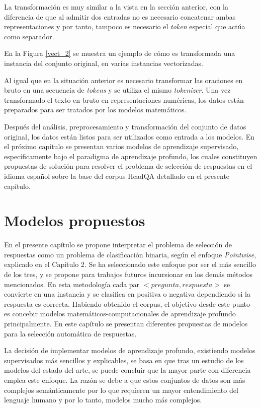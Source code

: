 La transformación es muy similar a la vista en la sección anterior, con la diferencia de que al admitir dos entradas no es necesario concatenar ambas representaciones y por tanto, tampoco es necesario el \textit{token} especial que actúa como separador.

En la Figura \ref{vect_2} se muestra un ejemplo de cómo es transformada una instancia del conjunto original, en varias instancias vectorizadas. 

Al igual que en la situación anterior es necesario transformar las oraciones en bruto en una secuencia de \textit{tokens} y se utiliza el mismo \textit{tokenizer}.
Una vez transformado el texto en bruto en representaciones numéricas, los datos están preparados para ser tratados por los modelos matemáticos.   


Después del análisis, preprocesamiento y transformación del conjunto de datos original, los datos están listos para ser utilizados como entrada a los modelos. En el próximo capítulo se presentan varios modelos de aprendizaje supervisado, específicamente bajo el paradigma de aprendizaje profundo, los cuales constituyen propuestas de solución para resolver el problema de selección de respuestas en el idioma español sobre la base del corpus HeadQA detallado en el presente capítulo.


\chapter{Modelos propuestos}\label{chapter:models}

En el presente capítulo se propone interpretar el problema de selección de respuestas como un problema de clasificación binaria, según el enfoque \textit{Pointwise}, explicado en el Capítulo 2. Se ha seleccionado este enfoque por ser el más sencillo de los tres, y se propone para trabajos futuros incursionar en los demás métodos mencionados. En esta metodología cada par $<pregunta, respuesta>$ se convierte en una instancia y se clasifica en positiva o negativa dependiendo si la respuesta es correcta. Habiendo obtenido el corpus, el objetivo desde este punto es concebir modelos matemáticos-computacionales de aprendizaje profundo principalmente. En este capítulo se presentan diferentes propuestas de modelos para la selección automática de respuestas. 

La decisión de implementar modelos de aprendizaje profundo, existiendo modelos supervisados más sencillos y explicables, se basa en que tras un estudio de los modelos del estado del arte, se puede concluir que la mayor parte con diferencia emplea este enfoque. La razón se debe a que estos conjuntos de datos son más complejos semánticamente por lo que requieren un mayor entendimiento del lenguaje humano y por lo tanto, modelos mucho más complejos. 

